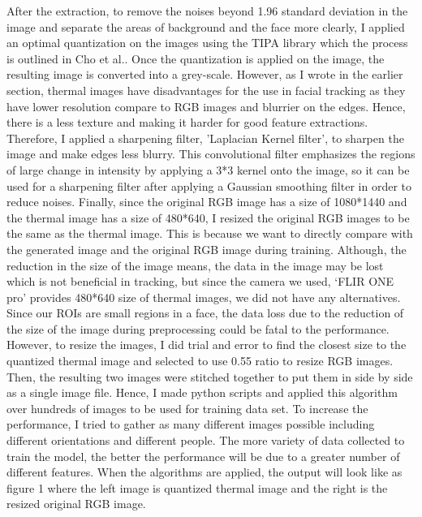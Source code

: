 \documentclass[conference]{IEEEtran}
\begin{document}
After the extraction, to remove the noises beyond 1.96 standard deviation in the image and separate the areas of background and the face more clearly, I applied an optimal quantization on the images using the TIPA library\cite{b7} which the process is outlined in Cho et al.\cite{b6}. Once the quantization is applied on the image, the resulting image is converted into a grey-scale. 
However, as I wrote in the earlier section, thermal images have disadvantages for the use in facial tracking as they have lower resolution compare to RGB images and blurrier on the edges\cite{b2}. Hence, there is a less texture and making it harder for good feature extractions. Therefore, I applied a sharpening filter, ’Laplacian Kernel filter’, to sharpen the image and make edges less blurry. This convolutional filter emphasizes the regions of large change in intensity by applying a 3*3 kernel onto the image, so it can be used for a sharpening filter after applying a Gaussian smoothing filter in order to reduce noises.
Finally, since the original RGB image has a size of 1080*1440 and the thermal image has a size of 480*640, I resized the original RGB images to be the same as the thermal image. This is because we want to directly compare with the generated image and the original RGB image during training. Although, the reduction in the size of the image means, the data in the image may be lost which is not beneficial in tracking, but since the camera we used, ‘FLIR ONE pro’ provides 480*640 size of thermal images, we did not have any alternatives. Since our ROIs are small regions in a face, the data loss due to the reduction of the size of the image during preprocessing could be fatal to the performance. However, to resize the images, I did trial and error to find the closest size to the quantized thermal image and selected to use 0.55 ratio to resize RGB images. Then, the resulting two images were stitched together to put them in side by side as a single image file. Hence, I made python scripts and applied this algorithm over hundreds of images to be used for training data set. To increase the performance, I tried to gather as many different images possible including different orientations and different people. The more variety of data collected to train the model, the better the performance will be due to a greater number of different features. When the algorithms are applied, the output will look like as figure 1 where the left image is quantized thermal image and the right is the resized original RGB image. 
\end{document}

